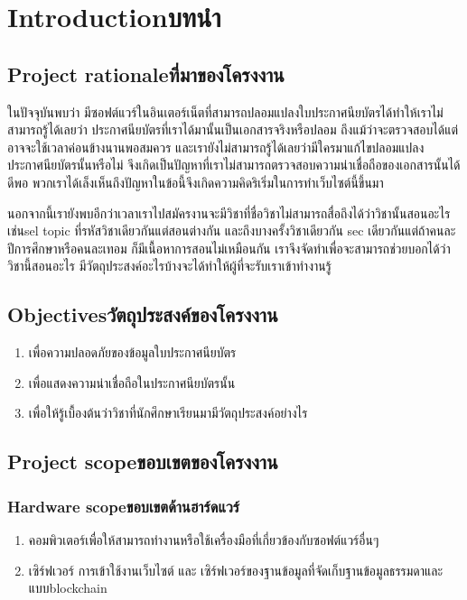 \chapter{\ifenglish Introduction\else บทนำ\fi}

\section{\ifenglish Project rationale\else ที่มาของโครงงาน\fi}
\enskip \enskip \enskip \enskip \enskip 
ในปัจจุบันพบว่า มีซอฟต์แวร์ในอินเตอร์เน็ตที่สามารถปลอมแปลงใบประกาศนียบัตรได้ทำให้เราไม่สามารถรู้ได้เลยว่า ประกาศนียบัตรที่เราได้มานั้นเป็นเอกสารจริงหรือปลอม 
ถึงแม้ว่าจะตรวจสอบได้แต่อาจจะใช้เวลาค่อนข้างนานพอสมควร  และเรายังไม่สามารถรู้ได้เลยว่ามีใครมาแก้ไขปลอมแปลงประกาศนียบัตรนั้นหรือไม่
จึงเกิดเป็นปัญหาที่เราไม่สามารถตรวจสอบความน่าเชื่อถือของเอกสารนั้นได้ดีพอ พวกเราได้เล็งเห็นถึงปัญหาในข้อนี้จึงเกิดความคิดริเริ่มในการทำเว็บไซต์นี้ขึ้นมา 

\enskip \enskip
นอกจากนี้เรายังพบอีกว่าเวลาเราไปสมัครงานจะมีวิชาที่ชื่อวิชาไม่สามารถสื่อถึงได้ว่าวิชานั้นสอนอะไรเช่นsel topic ที่รหัสวิชาเดียวกันแต่สอนต่างกัน และถึงบางครั้งวิชาเดียวกัน sec เดียวกันแต่ถ้าคนละปีการศึกษาหรือคนละเทอม ก็มีเนื้อหาการสอนไม่เหมือนกัน เราจึงจัดทำเพื่อจะสามารถช่วยบอกได้ว่าวิชานี้สอนอะไร มีวัตถุประสงค์อะไรบ้างจะได้ทำให้ผู้ที่จะรับเราเข้าทำงานรู้


\section{\ifenglish Objectives\else วัตถุประสงค์ของโครงงาน\fi}
\begin{enumerate}
    \item เพื่อความปลอดภัยของข้อมูลใบประกาศนียบัตร
    \item เพื่อแสดงความน่าเชื่อถือในประกาศนียบัตรนั้น
    \item เพื่อให้รู้เบื้องต้นว่าวิชาที่นักศึกษาเรียนมามีวัตถุประสงค์อย่างไร
\end{enumerate}

\section{\ifenglish Project scope\else ขอบเขตของโครงงาน\fi}

\subsection{\ifenglish Hardware scope\else ขอบเขตด้านฮาร์ดแวร์\fi}
\begin{enumerate}
    \item คอมพิวเตอร์เพื่อให้สามารถทํางานหรือใช้เครื่องมือที่เกี่ยวข้องกับซอฟต์แวร์อื่นๆ
    \item เซิร์ฟเวอร์ การเข้าใช้งานเว็บไซต์ และ เซิร์ฟเวอร์ของฐานข้อมูลที่จัดเก็บฐานข้อมูลธรรมดาและแบบblockchain
\end{enumerate}

